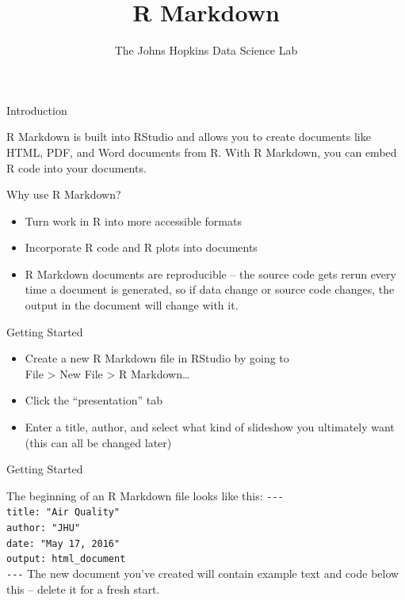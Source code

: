 \documentclass[
  ignorenonframetext,
]{beamer}
\title{R Markdown}
\author{The Johns Hopkins Data Science Lab}
\date{}
\providecommand{\tightlist}{%
  \setlength{\itemsep}{0pt}\setlength{\parskip}{0pt}}
\begin{document}
\frame{\titlepage}

\begin{frame}{Introduction}
\protect\hypertarget{introduction}{}

R Markdown is built into RStudio and allows you to create documents like
HTML, PDF, and Word documents from R. With R Markdown, you can embed R
code into your documents.

\begin{block}{Why use R Markdown?}

\begin{itemize}
\tightlist
\item
  Turn work in R into more accessible formats
\item
  Incorporate R code and R plots into documents
\item
  R Markdown documents are reproducible -- the source code gets rerun
  every time a document is generated, so if data change or source code
  changes, the output in the document will change with it.
\end{itemize}

\end{block}

\end{frame}

\begin{frame}{Getting Started}
\protect\hypertarget{getting-started}{}

\begin{itemize}
\tightlist
\item
  Create a new R Markdown file in RStudio by going to\\
  File \textgreater{} New File \textgreater{} R Markdown\ldots{}
\item
  Click the ``presentation'' tab
\item
  Enter a title, author, and select what kind of slideshow you
  ultimately want (this can all be changed later)
\end{itemize}

\end{frame}

\begin{frame}[fragile]{Getting Started}
\protect\hypertarget{getting-started-1}{}

The beginning of an R Markdown file looks like this: \texttt{-\/-\/-}\\
\texttt{title:\ "Air\ Quality"}~\\
\texttt{author:\ "JHU"}~\\
\texttt{date:\ "May\ 17,\ 2016"}~\\
\texttt{output:\ html\_document}~\\
\texttt{-\/-\/-} The new document you've created will contain example
text and code below this -- delete it for a fresh start.

\end{frame}
\end{document}
